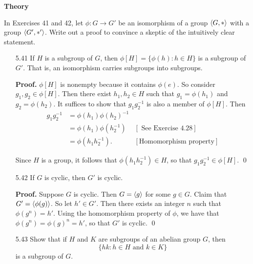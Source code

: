 \noindent      \textbf{Theory}

\noindent      In Exercises 41 and 42, let $\phi : G \rightarrow G'$ be an
               isomorphism of a group $\langle G, * \rangle$ with a group $\langle G', *' \rangle$.
               Write out a proof to convince a skeptic of the intuitively clear
               statement.

\begin{enumerate}
   \item[5.41] If $H$ is a subgroup of $G$, then
               $\phi[H] = \{\phi(h) : h \in H\}$ is a subgroup of $G'$. That is,
               an isomorphism carries subgroups into subgroups.

      \textbf{Proof.} $\phi[H]$ is nonempty because it contains $\phi(e)$. So
      consider $g_1, g_2 \in \phi[H]$. Then there exist $h_1, h_2 \in H$ such 
      that $g_1 = \phi(h_1)$ and $g_2 = \phi(h_2)$. It suffices to show that 
      $g_1g_2^{-1}$ is also a member of $\phi[H]$. Then
      \begin{align*}
         g_1g_2^{-1} &= \phi(h_1)\phi(h_2)^{-1} \\
                     &= \phi(h_1)\phi(h_2^{-1}) &[\text{ See Exercise 4.28}] \\
                     &= \phi(h_1h_2^{-1}). &[\text{Homomorphism property}]
      \end{align*}

      Since $H$ is a group, it follows that $\phi(h_1h_2^{-1}) \in H$, so that
      $g_1g_2^{-1} \in \phi[H]$. \qed
   \item[5.42] If $G$ is cyclic, then $G'$ is cyclic.

      \textbf{Proof.} Suppose $G$ is cyclic. Then $G = \langle g \rangle$ for some
      $g \in G$. Claim that $G' = \langle \phi(g) \rangle$. So let $h' \in G'$. Then there
      exists an integer $n$ such that  $\phi(g^n) = h'$. Using the homomorphism
      property of $\phi$, we have that $\phi(g^n) = \phi(g)^n = h'$, so that 
      $G'$ is cyclic. \qed
   \item[5.43] Show that if $H$ and $K$ are subgroups of an abelian group $G$,
               then
               $$\{hk : h \in H  \text{ and } k \in K\}$$
               is a subgroup of $G$.


\end{enumerate}
